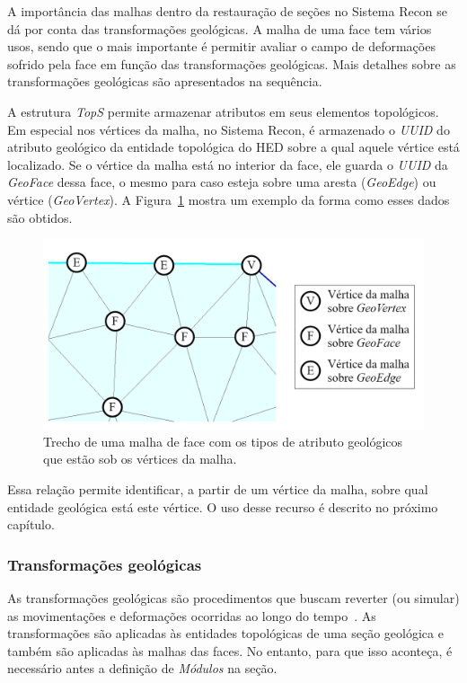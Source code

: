 A importância das malhas dentro da restauração de seções no Sistema Recon se dá por conta das transformações geológicas. A malha de uma face tem vários usos, sendo que o mais importante é permitir avaliar o campo de deformações sofrido pela face em função das transformações geológicas. Mais detalhes sobre as transformações geológicas são apresentados na sequência.

A estrutura \textit{TopS} permite armazenar atributos em seus elementos topológicos. Em especial nos vértices da malha, no Sistema Recon, é armazenado o \textit{UUID} do atributo geológico da entidade topológica do HED sobre a qual aquele vértice está localizado. Se o vértice da malha está no interior da face, ele guarda o \textit{UUID} da \textit{GeoFace} dessa face, o mesmo para caso esteja sobre uma aresta (\textit{GeoEdge}) ou vértice (\textit{GeoVertex}). A Figura~\ref{fig-recon-4} mostra um exemplo da forma como esses dados são obtidos.

\begin{figure} [H]
  \begin{center}
    \includegraphics[width=\textwidth]{images/fig-recon-4}
    \caption{Trecho de uma malha de face com os tipos de atributo geológicos que estão sob os vértices da malha.}\label{fig-recon-4}
  \end{center}
\end{figure}

Essa relação permite identificar, a partir de um vértice da malha, sobre qual entidade geológica está este vértice. O uso desse recurso é descrito no próximo capítulo.

\subsubsection{Transformações geológicas}

As transformações geológicas são procedimentos que buscam reverter (ou simular) as movimentações e deformações ocorridas ao longo do tempo~\cite{Santi}. As transformações são aplicadas às entidades topológicas de uma seção geológica e também são aplicadas às malhas das faces. No entanto, para que isso aconteça, é necessário antes a definição de \textit{Módulos} na seção. 

